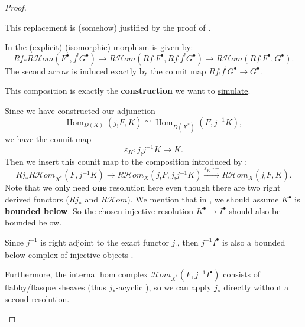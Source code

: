 \begin{proof}
\begin{enumerate}
              This replacement is (somehow) justified by the proof of \cite[Thm.~3.1.12]{KashiwaraSchapira1994Sheaves}.

              In \cite[Prop.~3.10]{KashiwaraSchapira1994Sheaves} the (explicit) (isomorphic) morphism is given by:
              \[
                  Rf_*R\mathcal Hom(F^\bullet,f^!G^\bullet) \longrightarrow R\mathcal Hom(Rf_!F^\bullet,Rf_!f^!G^\bullet) \longrightarrow R\mathcal Hom(Rf_!F^\bullet,G^\bullet).
              \]
              The second arrow is induced exactly by the counit map $Rf_!f^!G^\bullet \to G^\bullet$.

              This composition is exactly the \textbf{construction} we want to \underline{simulate}.

              Since we have constructed our adjunction
              \[
                  \operatorname{Hom}_{D(X)}(j_! F,K) \cong \operatorname{Hom}_{D(X^*)}(F,j^{-1} K),
              \]
              we have the counit map
              \[
                  \varepsilon_K: j_! j^{-1} K \longrightarrow K.
              \]
              Then we insert this counit map to the composition introduced by \cite[Prop.~3.10]{KashiwaraSchapira1994Sheaves}:
              \[
                  Rj_* R\mathcal Hom_{X^*}(F, j^{-1}K) \longrightarrow R\mathcal Hom_X(j_! F, j_! j^{-1}K) \xrightarrow{\varepsilon_K \circ -} R\mathcal Hom_X(j_! F, K).
              \]
              Note that we only need \textbf{one} resolution here even though there are two right derived functors ($Rj_*$ and $R\mathcal Hom$).
              We mention that in \cite[Example~1.10.11]{KashiwaraSchapira1994Sheaves}, we should assume $K^\bullet$ is \textbf{bounded below}.
              So the chosen injective resolution $K^\bullet\to I^\bullet$ \cite[Proposition~C.1.7]{hotta2008d} \cite[\href{https://stacks.math.columbia.edu/tag/05TI}{Tag 05TI}]{stacks-project} should also be bounded below.

              Since $j^{-1}$ is right adjoint to the exact functor $j_!$, then $j^{-1}I^\bullet$ is also a bounded below complex of injective objects \cite[\href{https://stacks.math.columbia.edu/tag/015Z}{Tag 015Z}]{stacks-project}.

              Furthermore, the internal hom complex $\mathcal Hom_{X^*}(F, j^{-1}I^\bullet)$ consists of flabby/flasque sheaves \cite[Corollary~C.1.14]{hotta2008d}
              (thus $j_*$-acyclic \cite[\href{https://stacks.math.columbia.edu/tag/09T0}{Tag 09T0}, \href{https://stacks.math.columbia.edu/tag/09SW}{Tag 09SW}]{stacks-project}),
              so we can apply $j_*$ directly without a second resolution.


\end{enumerate}
\end{proof}

